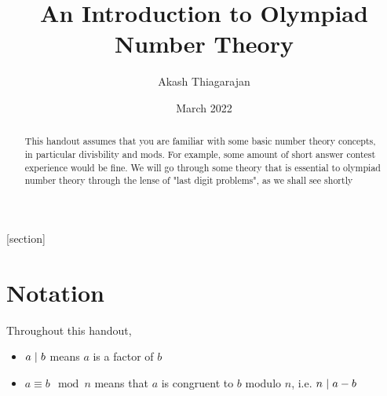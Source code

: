 \documentclass{article}
\title{An Introduction to Olympiad Number Theory}
\author{Akash Thiagarajan}
\date{March 2022}
\begin{document}
\newenvironment{claim}[1]{\par\noindent\underline{Claim:}\space#1}{}
\newenvironment{claimproof}[1]{\par\noindent\underline{Proof:}\space#1}{\hfill $\blacksquare$}

\newcommand{\divides}{\hspace{0.3em}|\hspace{0.3em}}

[section]

\newenvironment{solution}{\\ \textbf{Solution:} }{\\~\\}
\newenvironment{idea}{\\ \emph{Idea:}}{\\}
\maketitle
\setcounter{section}{-1}
\begin{abstract}
This handout assumes that you are familiar with some basic number theory concepts, in particular divisbility and mods. For example, some amount of short answer contest experience would be fine. We will go through some theory that is essential to olympiad number theory through the lense of "last digit problems", as we shall see shortly
\end{abstract}
\section{Notation}
Throughout this handout, 
\begin{itemize}
   \item $a \divides b$ means $a$ is a factor of $b$
   \item $a \equiv b \mod n$ means that $a$ is congruent to $b$ modulo $n$, i.e. $n \divides a-b$
\end{itemize}
\end{document}
